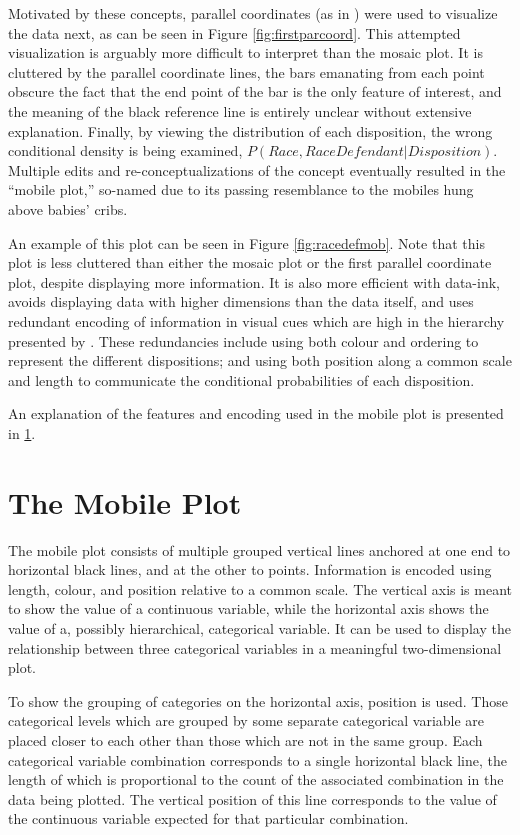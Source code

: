 Motivated by these concepts, parallel coordinates (as in \cite{wegman1990}) were used to visualize the data next, as can be seen
in Figure \ref{fig:firstparcoord}. This attempted visualization is arguably more difficult to interpret than the mosaic plot. It
is cluttered by the parallel coordinate lines, the bars emanating from each point obscure the fact that the end point of the bar
is the only feature of interest, and the meaning of the black reference line is entirely unclear without extensive
explanation. Finally, by viewing the distribution of each disposition, the wrong conditional density is being examined,
$P(Race,Race Defendant|Disposition)$. Multiple edits and re-conceptualizations of the concept eventually resulted in the ``mobile
plot,'' so-named due to its passing resemblance to the mobiles hung above babies' cribs.

An example of this plot can be seen in Figure \ref{fig:racedefmob}. Note that this plot is less cluttered than either the mosaic plot or
the first parallel coordinate plot, despite displaying more information. It is also more efficient with data-ink, avoids
displaying data with higher dimensions than the data itself, and uses redundant encoding of information in visual cues which are
high in the hierarchy presented by \cite{cleveland1987}. These redundancies include using both colour and ordering to represent
the different dispositions; and using both position along a common scale and length to communicate the conditional probabilities
of each disposition.

An explanation of the features and encoding used in the mobile plot is presented in \ref{app:mobile}.

\section{The Mobile Plot} \label{app:mobile}

The mobile plot consists of multiple grouped vertical lines anchored at one end to horizontal black lines, and at the other to
points. Information is encoded using length, colour, and position relative to a common scale. The vertical axis is meant to show
the value of a continuous variable, while the horizontal axis shows the value of a, possibly hierarchical, categorical
variable. It can be used to display the relationship between three
categorical variables in a meaningful
two-dimensional plot.

To show the grouping of categories on the horizontal axis, position is used. Those categorical levels which are grouped by some
separate categorical variable are placed closer to each other than those which are not in the same group. Each categorical
variable combination corresponds to a single horizontal black line, the length of which is proportional to the count of the
associated combination in the data being plotted. The vertical position of this line corresponds to the value of the continuous
variable expected for that particular combination.

